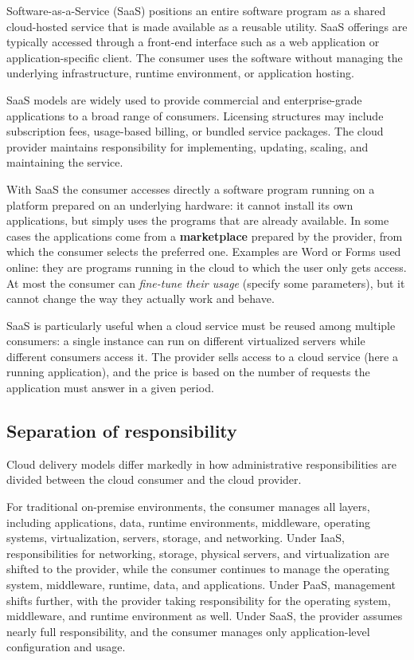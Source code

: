 Software-as-a-Service (SaaS) positions an entire software program as a shared cloud-hosted service that is made available as a reusable utility. SaaS offerings are typically accessed through a front-end interface such as a web application or application-specific client. The consumer uses the software without managing the underlying infrastructure, runtime environment, or application hosting.

SaaS models are widely used to provide commercial and enterprise-grade applications to a broad range of consumers. Licensing structures may include subscription fees, usage-based billing, or bundled service packages. The cloud provider maintains responsibility for implementing, updating, scaling, and maintaining the service.

With SaaS the consumer accesses directly a software program running on a platform prepared on an underlying hardware: it cannot install its own applications, but simply uses the programs that are already available. In some cases the applications come from a \textbf{marketplace} prepared by the provider, from which the consumer selects the preferred one. Examples are Word or Forms used online: they are programs running in the cloud to which the user only gets access. At most the consumer can \emph{fine-tune their usage} (specify some parameters), but it cannot change the way they actually work and behave.

SaaS is particularly useful when a cloud service must be reused among multiple consumers: a single instance can run on different virtualized servers while different consumers access it. The provider sells access to a cloud service (here a running application), and the price is based on the number of requests the application must answer in a given period.

\begin{center}
\end{center}

\subsection{Separation of responsibility}

Cloud delivery models differ markedly in how administrative responsibilities are divided between the cloud consumer and the cloud provider.

For traditional on-premise environments, the consumer manages all layers, including applications, data, runtime environments, middleware, operating systems, virtualization, servers, storage, and networking. Under IaaS, responsibilities for networking, storage, physical servers, and virtualization are shifted to the provider, while the consumer continues to manage the operating system, middleware, runtime, data, and applications. Under PaaS, management shifts further, with the provider taking responsibility for the operating system, middleware, and runtime environment as well. Under SaaS, the provider assumes nearly full responsibility, and the consumer manages only application-level configuration and usage.

